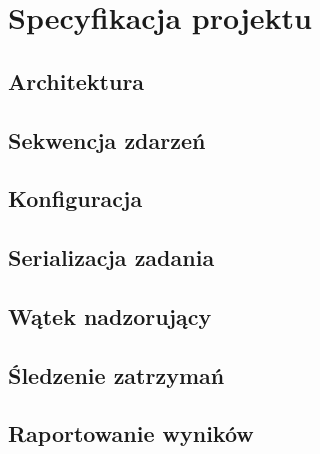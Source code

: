 \chapter{Specyfikacja projektu}
\label{cha:specyfikacjaProjektu}

\section{Architektura}
\label{sec:architektura}

\section{Sekwencja zdarzeń}
\label{sec:sekwencja}

\section{Konfiguracja}
\label{sec:konfiguracja}

\section{Serializacja zadania}
\label{sec:serializacja}

\section{Wątek nadzorujący}
\label{sec:nadzorca}

\section{Śledzenie zatrzymań}
\label{sec:zatrzymania}

\section{Raportowanie wyników}
\label{sec:raportowanie}